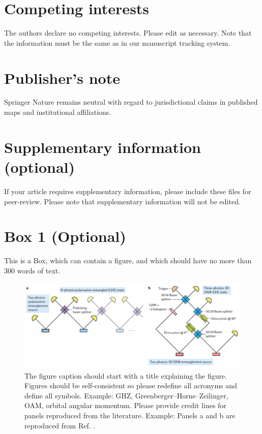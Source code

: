 \documentclass[fleqn,10pt]{wlscirep}
\begin{document}
\section*{Competing interests}
The authors declare no competing interests. Please edit as necessary. Note that the information must be the same as in our manuscript tracking system.

\section*{Publisher’s note}
Springer Nature remains neutral with regard to jurisdictional claims in published maps and institutional affiliations.

\section*{Supplementary information (optional)}
If your article requires supplementary information, please include these files for peer-review. Please note that supplementary information will not be edited.

\newpage
\section*{Box 1 (Optional)}
This is a Box, which can contain a figure, and which should have no more than 300 words of text.

\begin{figure}[ht]
\centering
\includegraphics[width=\linewidth]{fig}
\caption{The figure caption should start with a title explaining the figure. Figures should be self-consistent so please redefine all acronyms and define all symbols. Example: GHZ, Greenberger–Horne–Zeilinger, OAM, orbital angular momentum. Please provide credit lines for panels reproduced from the literature. Example: Panels a and b are reproduced from Ref. \cite{TR}.}
\label{fig}
\end{figure}
\end{document}
